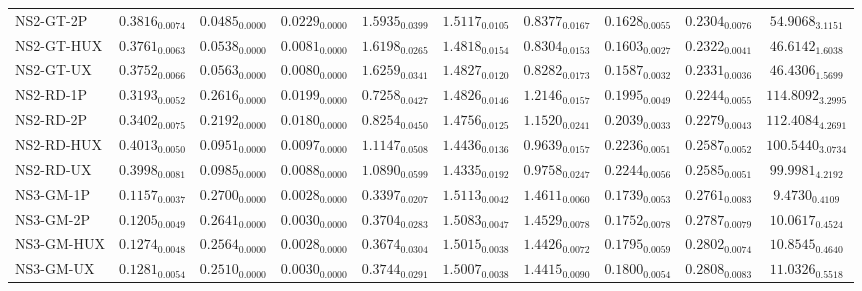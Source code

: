 \begin{longtable}{@{}lccccccccc@{}}
NS2-GT-2P & $0.3816_{0.0074}$ & $0.0485_{0.0000}$ & $0.0229_{0.0000}$ & $\mathbf{1.5935}_{0.0399}$ & $1.5117_{0.0105}$ & $\mathbf{0.8377}_{0.0167}$ & $0.1628_{0.0055}$ & $0.2304_{0.0076}$ & $54.9068_{3.1151}$ \\
NS2-GT-HUX & $0.3761_{0.0063}$ & $0.0538_{0.0000}$ & $0.0081_{0.0000}$ & $\mathbf{1.6198}_{0.0265}$ & $1.4818_{0.0154}$ & $\mathbf{0.8304}_{0.0153}$ & $0.1603_{0.0027}$ & $0.2322_{0.0041}$ & $46.6142_{1.6038}$ \\
NS2-GT-UX & $0.3752_{0.0066}$ & $0.0563_{0.0000}$ & $0.0080_{0.0000}$ & $\mathbf{1.6259}_{0.0341}$ & $1.4827_{0.0120}$ & $\mathbf{0.8282}_{0.0173}$ & $0.1587_{0.0032}$ & $0.2331_{0.0036}$ & $46.4306_{1.5699}$ \\
NS2-RD-1P & $0.3193_{0.0052}$ & $0.2616_{0.0000}$ & $0.0199_{0.0000}$ & $0.7258_{0.0427}$ & $1.4826_{0.0146}$ & $1.2146_{0.0157}$ & $0.1995_{0.0049}$ & $0.2244_{0.0055}$ & $\mathbf{114.8092}_{3.2995}$ \\
NS2-RD-2P & $0.3402_{0.0075}$ & $0.2192_{0.0000}$ & $0.0180_{0.0000}$ & $0.8254_{0.0450}$ & $1.4756_{0.0125}$ & $1.1520_{0.0241}$ & $0.2039_{0.0033}$ & $0.2279_{0.0043}$ & $112.4084_{4.2691}$ \\
NS2-RD-HUX & $\mathbf{0.4013}_{0.0050}$ & $0.0951_{0.0000}$ & $0.0097_{0.0000}$ & $1.1147_{0.0508}$ & $1.4436_{0.0136}$ & $0.9639_{0.0157}$ & $0.2236_{0.0051}$ & $0.2587_{0.0052}$ & $100.5440_{3.0734}$ \\
NS2-RD-UX & $\mathbf{0.3998}_{0.0081}$ & $0.0985_{0.0000}$ & $0.0088_{0.0000}$ & $1.0890_{0.0599}$ & $1.4335_{0.0192}$ & $0.9758_{0.0247}$ & $0.2244_{0.0056}$ & $0.2585_{0.0051}$ & $99.9981_{4.2192}$ \\
NS3-GM-1P & $0.1157_{0.0037}$ & $0.2700_{0.0000}$ & $0.0028_{0.0000}$ & $0.3397_{0.0207}$ & $1.5113_{0.0042}$ & $1.4611_{0.0060}$ & $0.1739_{0.0053}$ & $0.2761_{0.0083}$ & $9.4730_{0.4109}$ \\
NS3-GM-2P & $0.1205_{0.0049}$ & $0.2641_{0.0000}$ & $0.0030_{0.0000}$ & $0.3704_{0.0283}$ & $1.5083_{0.0047}$ & $1.4529_{0.0078}$ & $0.1752_{0.0078}$ & $0.2787_{0.0079}$ & $10.0617_{0.4524}$ \\
NS3-GM-HUX & $0.1274_{0.0048}$ & $0.2564_{0.0000}$ & $0.0028_{0.0000}$ & $0.3674_{0.0304}$ & $1.5015_{0.0038}$ & $1.4426_{0.0072}$ & $0.1795_{0.0059}$ & $0.2802_{0.0074}$ & $10.8545_{0.4640}$ \\
NS3-GM-UX & $0.1281_{0.0054}$ & $0.2510_{0.0000}$ & $0.0030_{0.0000}$ & $0.3744_{0.0291}$ & $1.5007_{0.0038}$ & $1.4415_{0.0090}$ & $0.1800_{0.0054}$ & $0.2808_{0.0083}$ & $11.0326_{0.5518}$ \\

\end{longtable}
